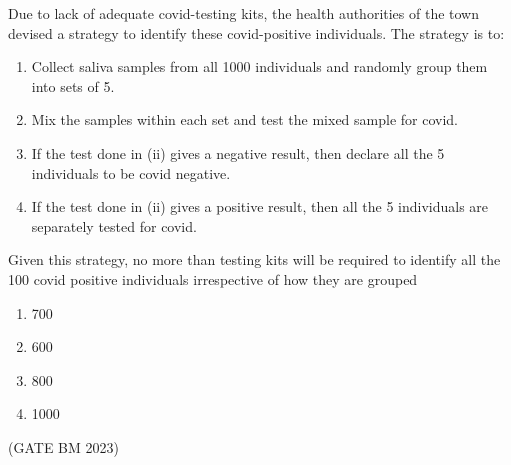 \begin{enumerate}[label=\thechapter.\arabic*,ref=\thechapter.\theenumi]
Due to lack of adequate covid-testing kits, the health authorities of the town devised
a strategy to identify these covid-positive individuals. The strategy is to:
\begin{enumerate}
\item Collect saliva samples from all 1000 individuals and randomly group
them into sets of 5.
\item Mix the samples within each set and test the mixed sample for covid.
\item If the test done in (ii) gives a negative result, then declare all the 5
individuals to be covid negative.
\item If the test done in (ii) gives a positive result, then all the 5 individuals
are separately tested for covid.
\end{enumerate}
Given this strategy, no more than testing kits will be required to identify
all the 100 covid positive individuals irrespective of how they are grouped \\ 
\begin{enumerate}
\item 700
\item 600
\item 800
\item 1000
\end{enumerate}
\hfill (GATE BM 2023)\\

\end{enumerate}
